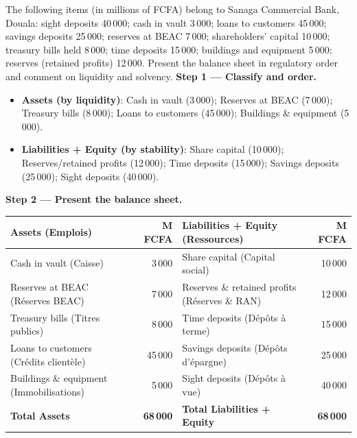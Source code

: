 \documentclass[11pt]{article}
\begin{document}
\begin{exoresolu}
The following items (in millions of FCFA) belong to Sanaga Commercial Bank, Douala: sight deposits 40\,000; cash in vault 3\,000; loans to customers 45\,000; savings deposits 25\,000; reserves at BEAC 7\,000; shareholders' capital 10\,000; treasury bills held 8\,000; time deposits 15\,000; buildings and equipment 5\,000; reserves (retained profits) 12\,000. Present the balance sheet in regulatory order and comment on liquidity and solvency.
\tcblower
\textbf{Step 1 — Classify and order.}
\begin{itemize}
\item \textbf{Assets (by liquidity)}: Cash in vault (3\,000); Reserves at BEAC (7\,000); Treasury bills (8\,000); Loans to customers (45\,000); Buildings \& equipment (5\,000).
\item \textbf{Liabilities + Equity (by stability)}: Share capital (10\,000); Reserves/retained profits (12\,000); Time deposits (15\,000); Savings deposits (25\,000); Sight deposits (40\,000).
\end{itemize}

\textbf{Step 2 — Present the balance sheet.}
\begin{center}
\begin{tabularx}{\linewidth}{|X|r|X|r|}
\hline
\rowcolor{popblueL} \textbf{Assets (Emplois)} & \textbf{M FCFA} & \textbf{Liabilities + Equity (Ressources)} & \textbf{M FCFA} \\
\hline
Cash in vault (Caisse) & 3\,000 & Share capital (Capital social) & 10\,000 \\
Reserves at BEAC (Réserves BEAC) & 7\,000 & Reserves \& retained profits (Réserves \& RAN) & 12\,000 \\
Treasury bills (Titres publics) & 8\,000 & Time deposits (Dépôts à terme) & 15\,000 \\
Loans to customers (Crédits clientèle) & 45\,000 & Savings deposits (Dépôts d'épargne) & 25\,000 \\
Buildings \& equipment (Immobilisations) & 5\,000 & Sight deposits (Dépôts à vue) & 40\,000 \\
\hline
\textbf{Total Assets} & \textbf{68\,000} & \textbf{Total Liabilities + Equity} & \textbf{68\,000} \\
\hline
\end{tabularx}
\end{center}


\end{exoresolu}
\end{document}
